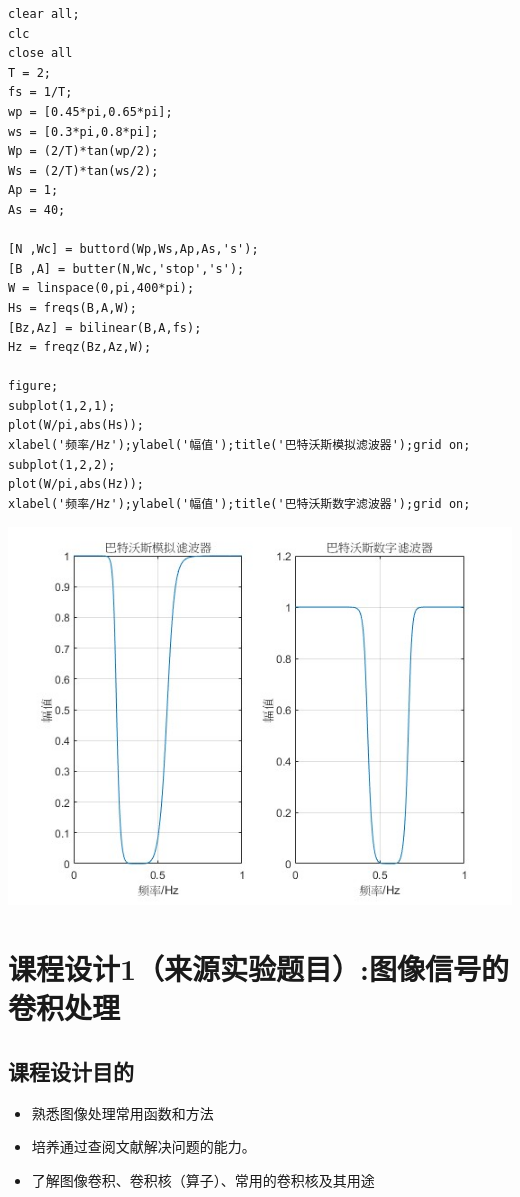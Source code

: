 \documentclass[a4paper,12pt]{article}
\begin{document}
\begin{lstlisting}
clear all;
clc
close all
T = 2;    
fs = 1/T;      
wp = [0.45*pi,0.65*pi];
ws = [0.3*pi,0.8*pi];
Wp = (2/T)*tan(wp/2); 
Ws = (2/T)*tan(ws/2);
Ap = 1; 
As = 40;

[N ,Wc] = buttord(Wp,Ws,Ap,As,'s');
[B ,A] = butter(N,Wc,'stop','s');
W = linspace(0,pi,400*pi);
Hs = freqs(B,A,W);
[Bz,Az] = bilinear(B,A,fs);
Hz = freqz(Bz,Az,W);
 
figure;
subplot(1,2,1);
plot(W/pi,abs(Hs)); 
xlabel('频率/Hz');ylabel('幅值');title('巴特沃斯模拟滤波器');grid on;
subplot(1,2,2);
plot(W/pi,abs(Hz));  
xlabel('频率/Hz');ylabel('幅值');title('巴特沃斯数字滤波器');grid on;

\end{lstlisting}

\centering 
\includegraphics[width=0.8\linewidth]{images/4_Verify/iir.jpg}
\justifying


\section{课程设计1（来源实验题目）:图像信号的卷积处理}
\subsection{课程设计目的}
\begin{itemize}
    \item 熟悉图像处理常用函数和方法
    \item 培养通过查阅文献解决问题的能力。
    \item 了解图像卷积、卷积核（算子）、常用的卷积核及其用途
\end{itemize}
\end{document}
